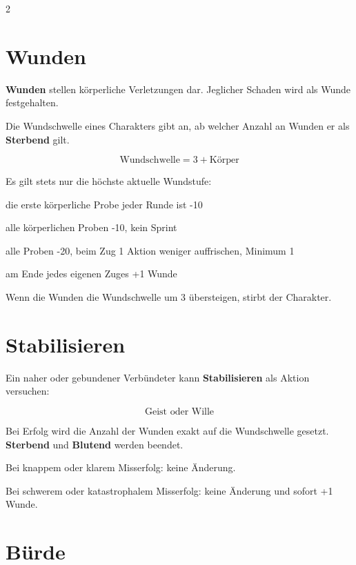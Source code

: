\label{ch:wunden}

\begin{multicols*}{2}
\section{Wunden}\label{sec:wunden}

\textbf{Wunden} stellen körperliche Verletzungen dar.
Jeglicher Schaden wird als Wunde festgehalten.

Die Wundschwelle eines Charakters gibt an, ab welcher Anzahl an Wunden er als \textbf{Sterbend} gilt.

\[
\text{Wundschwelle} = 3 + \text{Körper}
\]

Es gilt stets nur die höchste aktuelle Wundstufe:

\begin{description}[style=nextline,leftmargin=0pt]
\item[\textbf{Verletzt} (1+)] die erste körperliche Probe jeder Runde ist -10
\item[\textbf{Beeinträchtigt} (3+)] alle körperlichen Proben -10, kein Sprint
\item[\textbf{Kritisch} (5+)] alle Proben -20, beim Zug 1 Aktion weniger auffrischen, Minimum 1
\item[\textbf{Sterbend} (> Threshold)] am Ende jedes eigenen Zuges +1 Wunde
\end{description}

Wenn die Wunden die Wundschwelle um 3 übersteigen, stirbt der Charakter.

\section{Stabilisieren}\label{sec:stabilisieren}

Ein naher oder gebundener Verbündeter kann \textbf{Stabilisieren} als Aktion versuchen:

\[
\text{Geist oder Wille}
\]

Bei Erfolg wird die Anzahl der Wunden exakt auf die Wundschwelle gesetzt.
\textbf{Sterbend} und \textbf{Blutend} werden beendet.

Bei knappem oder klarem Misserfolg: keine Änderung.

Bei schwerem oder katastrophalem Misserfolg: keine Änderung und sofort +1 Wunde.

\section{Bürde}\label{sec:burde}


\end{multicols*}
